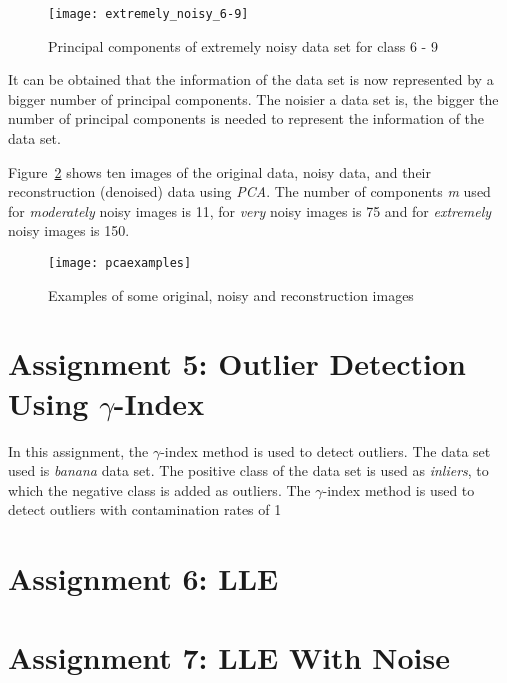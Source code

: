 \begin{figure}[h!]
	\centering
	\texttt{[image: extremely\_noisy\_6-9]}
	\caption{Principal components of extremely noisy data set for class 6 - 9}
	\label{fig:pcaExtreme69}
\end{figure}

It can be obtained that the information of the data set is now represented by a bigger number of principal components. The noisier a data set is, the bigger the number of principal components is needed to represent the information of the data set.

Figure~\ref{fig:pcaExamples} shows ten images of the original data, noisy data, and their reconstruction (denoised) data using \textit{PCA}. The number of components \textit{m} used for \textit{moderately} noisy images is 11, for \textit{very} noisy images is 75 and for \textit{extremely} noisy images is 150.

\begin{figure}[h!]
	\centering
	\texttt{[image: pcaexamples]}
	\caption{Examples of some original, noisy and reconstruction images}
	\label{fig:pcaExamples}
\end{figure}

\section{Assignment 5: Outlier Detection Using $\gamma$-Index}
\label{assignment5}

In this assignment, the $\gamma$-index method is used to detect outliers. The data set used is \textit{banana} data set. The positive class of the data set is used as \textit{inliers}, to which the negative class is added as outliers. The $\gamma$-index method is used to detect outliers with contamination rates of 1%


\section{Assignment 6: LLE}
\label{assignment6}


\section{Assignment 7: LLE With Noise}
\label{assignment7}